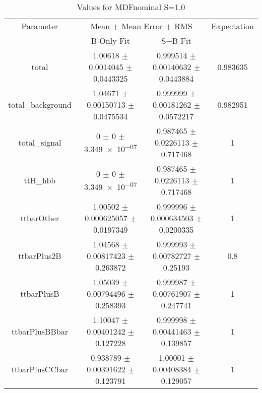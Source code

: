 \begin{table}
\centering
\caption{Values for MDFnominal S=1.0}
\begin{tabular}{cccc}
\toprule
Parameter & \multicolumn{2}{c}{Mean $\pm$ Mean Error $\pm$ RMS} & Expectation\\
 & B-Only Fit & S+B Fit & \\
\midrule
total & \num{1.00618} $\pm$ \num{0.0014045} $\pm$ \num{0.0443325} & \num{0.999514} $\pm$ \num{0.00140632} $\pm$ \num{0.0443884} & \num{0.983635}\\
total\_background & \num{1.04671} $\pm$ \num{0.00150713} $\pm$ \num{0.0475534} & \num{0.999999} $\pm$ \num{0.00181262} $\pm$ \num{0.0572217} & \num{0.982951}\\
total\_signal & \num{0} $\pm$ \num{0} $\pm$ \num{3.349e-07} & \num{0.987465} $\pm$ \num{0.0226113} $\pm$ \num{0.717468} & \num{1}\\
ttH\_hbb & \num{0} $\pm$ \num{0} $\pm$ \num{3.349e-07} & \num{0.987465} $\pm$ \num{0.0226113} $\pm$ \num{0.717468} & \num{1}\\
ttbarOther & \num{1.00502} $\pm$ \num{0.000625057} $\pm$ \num{0.0197349} & \num{0.999996} $\pm$ \num{0.000634503} $\pm$ \num{0.0200335} & \num{1}\\
ttbarPlus2B & \num{1.04568} $\pm$ \num{0.00817423} $\pm$ \num{0.263872} & \num{0.999993} $\pm$ \num{0.00782727} $\pm$ \num{0.25193} & \num{0.8}\\
ttbarPlusB & \num{1.05039} $\pm$ \num{0.00794496} $\pm$ \num{0.258393} & \num{0.999987} $\pm$ \num{0.00761907} $\pm$ \num{0.247741} & \num{1}\\
ttbarPlusBBbar & \num{1.10047} $\pm$ \num{0.00401242} $\pm$ \num{0.127228} & \num{0.999998} $\pm$ \num{0.00441463} $\pm$ \num{0.139857} & \num{1}\\
ttbarPlusCCbar & \num{0.938789} $\pm$ \num{0.00391622} $\pm$ \num{0.123791} & \num{1.00001} $\pm$ \num{0.00408384} $\pm$ \num{0.129057} & \num{1}\\
\bottomrule
\end{tabular}
\end{table}